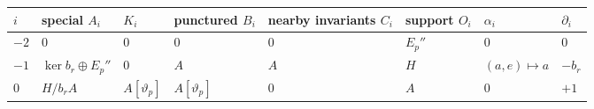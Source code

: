 {\def\LTcaptype{none} %
\begin{longtable}[]{@{}
  >{\raggedright\arraybackslash}p{}
  >{\raggedright\arraybackslash}p{}
  >{\raggedright\arraybackslash}p{}
  >{\raggedright\arraybackslash}p{}
  >{\raggedright\arraybackslash}p{}
  >{\raggedright\arraybackslash}p{}
  >{\raggedright\arraybackslash}p{}
  >{\raggedright\arraybackslash}p{}@{}}
\toprule\noalign{}
\begin{minipage}[b]{\linewidth}\raggedright
\(i\)
\end{minipage} & \begin{minipage}[b]{\linewidth}\raggedright
special \(A_i\)
\end{minipage} & \begin{minipage}[b]{\linewidth}\raggedright
\(K_i\)
\end{minipage} & \begin{minipage}[b]{\linewidth}\raggedright
punctured \(B_i\)
\end{minipage} & \begin{minipage}[b]{\linewidth}\raggedright
nearby invariants \(C_i\)
\end{minipage} & \begin{minipage}[b]{\linewidth}\raggedright
support \(O_i\)
\end{minipage} & \begin{minipage}[b]{\linewidth}\raggedright
\(\alpha_i\)
\end{minipage} & \begin{minipage}[b]{\linewidth}\raggedright
\(\partial_i\)
\end{minipage} \\
\midrule\noalign{}
\endhead
\bottomrule\noalign{}
\endlastfoot
\(-2\) & \(0\) & \(0\) & \(0\) & \(0\) & \(E_p''\) & \(0\) & \(0\) \\
\(-1\) & \(\ker b_r\oplus E_p''\) & \(0\) & \(A\) & \(A\) & \(H\) &
\((a,e)\mapsto a\) & \(-b_r\) \\
\(0\) & \(H/b_rA\) & \(A[\vartheta_p]\) & \(A[\vartheta_p]\) & \(0\) &
\(A\) & \(0\) & \(+1\) \\
\end{longtable}
}

